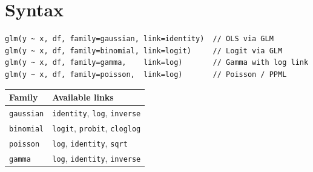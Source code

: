 \section{Syntax}

\begin{lstlisting}
glm(y ~ x, df, family=gaussian, link=identity)  // OLS via GLM
glm(y ~ x, df, family=binomial, link=logit)     // Logit via GLM
glm(y ~ x, df, family=gamma,    link=log)       // Gamma with log link
glm(y ~ x, df, family=poisson,  link=log)       // Poisson / PPML
\end{lstlisting}

\begin{center}
\begin{tabular}{ll}
\toprule
\textbf{Family} & \textbf{Available links} \\
\midrule
\texttt{gaussian}  & \texttt{identity}, \texttt{log}, \texttt{inverse} \\
\texttt{binomial}  & \texttt{logit}, \texttt{probit}, \texttt{cloglog} \\
\texttt{poisson}   & \texttt{log}, \texttt{identity}, \texttt{sqrt} \\
\texttt{gamma}     & \texttt{log}, \texttt{identity}, \texttt{inverse} \\
\bottomrule
\end{tabular}
\end{center}

